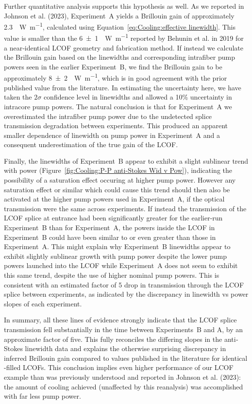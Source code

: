 Further quantitative analysis supports this hypothesis as well. As we reported in Johnson et al. (2023)\cite{johnson2023laser}, Experiment~A yields a Brillouin gain of approximately \SI{2.3}{\per\watt\per\meter}, calculated using Equation~\ref{eq:Cooling:effective linewidth}. This value is smaller than the \SI{6(1)}{\per\watt\per\meter} reported by Behunin et al. in 2019\cite{behunin2019spontaneous} for a near‐identical \ac{LCOF} geometry and fabrication method. If instead we calculate the Brillouin gain based on the linewidths and corresponding intrafiber pump powers seen in the earlier Experiment~B, we find the Brillouin gain to be approximately \SI{8(2)}{\per\watt\per\meter}, which is in good agreement with the prior published value from the literature. In estimating the uncertainty here, we have taken the \(2\sigma\) confidence level in linewidths and allowed a 10\% uncertainty in intracore pump powers. The natural conclusion is that for Experiment~A we overestimated the intrafiber pump power due to the undetected splice transmission degradation between experiments. This produced an apparent smaller dependence of linewidth on pump power in Experiment~A and a consequent underestimation of the true gain of the \ac{LCOF}.

Finally, the linewidths of Experiment~B appear to exhibit a slight sublinear trend with power (Figure~\ref{fig:Cooling:P-P anti-Stokes Wid v Pow}), indicating the possibility of a saturation effect occuring at higher pump power. However any saturation effect or similar which could cause this trend should then also be activated at the higher pump powers used in Experiment~A, if the optical transmission were the same across experiments. If instead the transmission of the \ac{LCOF} splice at entrance had been significantly greater for the earlier-run Experiment~B than for Experiment~A, the powers inside the \ac{LCOF} in Experiment~B could have been similar to or even greater than those in Experiment~A. This might explain why Experiment~B linewidths appear to exhibit slightly sublinear growth with pump power despite the lower pump powers launched into the \ac{LCOF} while Experiment~A does not seem to exhibit this same trend, despite the use of higher nominal pump powers. This is consistent with an estimated factor of 5 drop in transmission through the \ac{LCOF} splice between experiments, as indicated by the discrepancy in linewidth vs power slopes of each experiment.

In summary, all these lines of evidence strongly indicate that the \ac{LCOF} splice transmission fell substantially in the time between Experiments~B and A, by an approximate factor of five. This fully reconciles the differing slopes in the anti‐Stokes linewidth data and explains the otherwise surprising discrepancy in inferred Brillouin gain compared to values published in the literature for identical -filled \ac{LCOF}s. This conclusion implies even higher performance of our \ac{LCOF} example than was previously understood and reported in Johnson et al. (2023)\cite{johnson2023laser}: the amount of cooling achieved (unaffected by this reanalysis) was accomplished with far less pump power.

